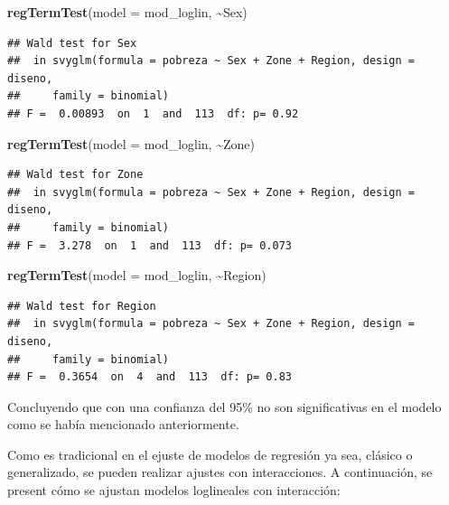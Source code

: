 \documentclass[
  12pt,
]{book}
\newenvironment{Shaded}{\begin{snugshade}}{\end{snugshade}}
\newcommand{\AttributeTok}[1]{\textcolor[rgb]{0.13,0.29,0.53}{#1}}
\newcommand{\FunctionTok}[1]{\textcolor[rgb]{0.13,0.29,0.53}{\textbf{#1}}}
\newcommand{\NormalTok}[1]{#1}
\newcommand{\SpecialCharTok}[1]{\textcolor[rgb]{0.81,0.36,0.00}{\textbf{#1}}}
\begin{document}
\begin{Shaded}
\begin{Highlighting}[]
  \FunctionTok{regTermTest}\NormalTok{(}\AttributeTok{model =}\NormalTok{ mod\_loglin, }\SpecialCharTok{\textasciitilde{}}\NormalTok{Sex)}
\end{Highlighting}
\end{Shaded}

\begin{verbatim}
## Wald test for Sex
##  in svyglm(formula = pobreza ~ Sex + Zone + Region, design = diseno, 
##     family = binomial)
## F =  0.00893  on  1  and  113  df: p= 0.92
\end{verbatim}

\begin{Shaded}
\begin{Highlighting}[]
  \FunctionTok{regTermTest}\NormalTok{(}\AttributeTok{model =}\NormalTok{ mod\_loglin, }\SpecialCharTok{\textasciitilde{}}\NormalTok{Zone)}
\end{Highlighting}
\end{Shaded}

\begin{verbatim}
## Wald test for Zone
##  in svyglm(formula = pobreza ~ Sex + Zone + Region, design = diseno, 
##     family = binomial)
## F =  3.278  on  1  and  113  df: p= 0.073
\end{verbatim}

\begin{Shaded}
\begin{Highlighting}[]
  \FunctionTok{regTermTest}\NormalTok{(}\AttributeTok{model =}\NormalTok{ mod\_loglin, }\SpecialCharTok{\textasciitilde{}}\NormalTok{Region)}
\end{Highlighting}
\end{Shaded}

\begin{verbatim}
## Wald test for Region
##  in svyglm(formula = pobreza ~ Sex + Zone + Region, design = diseno, 
##     family = binomial)
## F =  0.3654  on  4  and  113  df: p= 0.83
\end{verbatim}

Concluyendo que con una confianza del 95\% no son significativas en el modelo como se había mencionado anteriormente.

Como es tradicional en el ejuste de modelos de regresión ya sea, clásico o generalizado, se pueden realizar ajustes con interacciones. A continuación, se present cómo se ajustan modelos loglineales con interacción:
\end{document}
